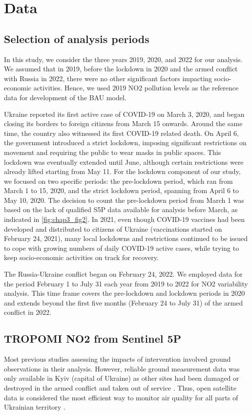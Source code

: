 \section{Data} \label{chap3_data}
\subsection{Selection of analysis periods}
In this study, we consider the three years 2019, 2020, and 2022 for our analysis. We assumed that in 2019, before the lockdown in 2020 and the armed conflict with Russia in 2022, there were no other significant factors impacting socio-economic activities. Hence, we used 2019 NO2 pollution levels as the reference data for development of the BAU model. \par
Ukraine reported its first active case of COVID-19 on March 3, 2020, and began closing its borders to foreign citizens from March 15 onwards. Around the same time, the country also witnessed its first COVID-19 related death. On April 6, the government introduced a strict lockdown, imposing significant restrictions on movement and requiring the public to wear masks in public spaces. This lockdown was eventually extended until June, although certain restrictions were already lifted starting from May 11. For the lockdown component of our study, we focused on two specific periods: the pre-lockdown period, which ran from March 1 to 15, 2020, and the strict lockdown period, spanning from April 6 to May 10, 2020. The decision to count the pre-lockdown period from March 1 was based on the lack of qualified S5P data available for analysis before March, as indicated in \ref{fig:chap3_fig2}. In 2021, even though COVID-19 vaccines had been developed and distributed to citizens of Ukraine (vaccinations started on February 24, 2021), many local lockdowns and restrictions continued to be issued to cope with growing numbers of daily COVID-19 active cases, while trying to keep socio-economic activities on track for recovery. \par
The Russia-Ukraine conflict began on February 24, 2022. We employed data for the period February 1 to July 31 each year from 2019 to 2022 for NO2 variability analysis. This time frame covers the pre-lockdown and lockdown periods in 2020 and extends beyond the first five months (February 24 to July 31) of the armed conflict in 2022.\par
\subsection{TROPOMI NO2 from Sentinel 5P}
Most previous studies assessing the impacts of intervention involved ground observations in their analysis. However, reliable ground measurement data was only available in Kyiv (capital of Ukraine) as other sites had been damaged or destroyed in the armed conflict and taken out of service \citep{savenets2021air}. Thus, open satellite data is considered the most efficient way to monitor air quality for all parts of Ukrainian territory \citep{shelestov2021air}. \par

